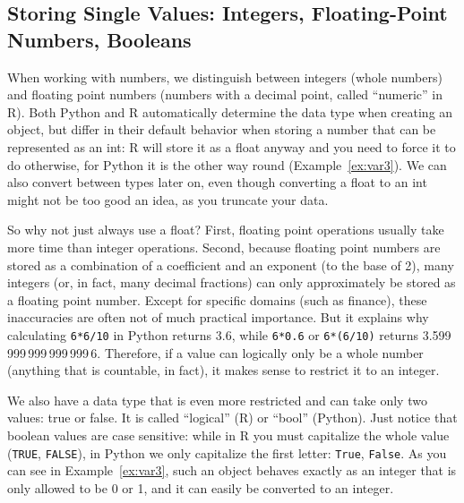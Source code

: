 



\subsection{Storing Single Values: Integers, Floating-Point Numbers, Booleans}\label{sec:primitives}

 When working with numbers, we distinguish between integers (whole
numbers) and floating point numbers (numbers with a decimal point,
called ``numeric'' in R). Both Python and R automatically determine the
data type when creating an object, but differ in their default
behavior when storing a number that can be represented as an int: R
will store it as a float anyway and you need to force it to do
otherwise, for Python it is the other way round
(Example~\ref{ex:var3}). We can also convert between types later on,
even though converting a float to an int might not be too good an idea,
as you truncate your data.

So why not just always use a float? First,
floating point operations usually take more time than integer operations.
Second, because floating point numbers are stored as a combination of
a coefficient and an exponent (to the base of 2), many integers (or,
in fact, many decimal fractions) can only approximately be stored
as a floating point number. Except for specific domains (such
as finance), these inaccuracies are often not of much practical importance.
But it explains why calculating \verb|6*6/10| in Python returns 3.6, while
\verb|6*0.6| or \verb|6*(6/10)| returns 3.599\,999\,999\,999\,999\,6. Therefore, if
a value can logically only be a whole number (anything that is
countable, in fact), it makes sense to restrict it to an integer.

We also have a data type that is even more restricted and can take
only two values: true or false. It is called ``logical'' (R) or ``bool''
(Python).  Just notice that boolean values are case sensitive:
while in R you must capitalize the whole value (\verb|TRUE|, \verb|FALSE|), in
Python we only capitalize the first letter: \verb|True|, \verb|False|.  As you can
see in Example~\ref{ex:var3}, such an object behaves exactly as an integer that
is only allowed to be 0 or 1, and it can easily be converted to an
integer.





